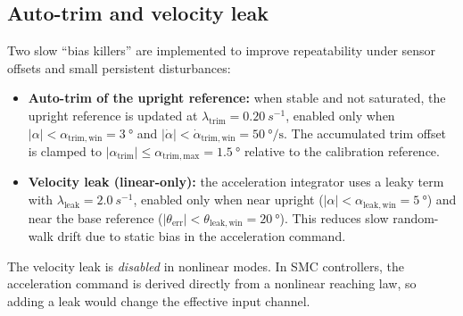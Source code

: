\subsection{Auto-trim and velocity leak}
Two slow ``bias killers'' are implemented to improve repeatability under sensor offsets and small persistent disturbances:
\begin{itemize}
  \item \textbf{Auto-trim of the upright reference:} when stable and not saturated, the upright reference is updated at $\lambda_{\mathrm{trim}}=\SI{0.20}{s^{-1}}$, enabled only when $|\alpha|<\alpha_{\mathrm{trim,win}}=\SI{3}{\degree}$ and $|\dot{\alpha}|<\dot{\alpha}_{\mathrm{trim,win}}=\SI{50}{\degree\per\second}$. The accumulated trim offset is clamped to $|\alpha_{\mathrm{trim}}|\le \alpha_{\mathrm{trim,max}}=\SI{1.5}{\degree}$ relative to the calibration reference.
  \item \textbf{Velocity leak (linear-only):} the acceleration integrator uses a leaky term with $\lambda_{\mathrm{leak}}=\SI{2.0}{s^{-1}}$, enabled only when near upright ($|\alpha|<\alpha_{\mathrm{leak,win}}=\SI{5}{\degree}$) and near the base reference ($|\theta_{\mathrm{err}}|<\theta_{\mathrm{leak,win}}=\SI{20}{\degree}$). This reduces slow random-walk drift due to static bias in the acceleration command.
\end{itemize}
The velocity leak is \emph{disabled} in nonlinear modes. In SMC controllers, the acceleration command is derived directly from a nonlinear reaching law, so adding a leak would change the effective input channel.
